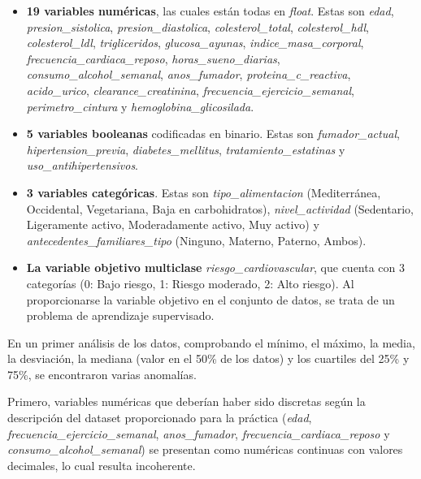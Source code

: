 \documentclass[journal,onecolumn]{IEEEtran}
\begin{document}
\begin{itemize}
    \item \textbf{19 variables numéricas}, las cuales están todas en \textit{float}. Estas son \textit{edad}, \textit{presion\_sistolica}, \textit{presion\_diastolica}, \textit{colesterol\_total}, \textit{colesterol\_hdl}, \textit{colesterol\_ldl}, \textit{trigliceridos}, \textit{glucosa\_ayunas}, \textit{indice\_masa\_corporal}, \textit{frecuencia\_cardiaca\_reposo}, \textit{horas\_sueno\_diarias}, \textit{consumo\_alcohol\_semanal}, \textit{anos\_fumador}, \textit{proteina\_c\_reactiva}, \textit{acido\_urico}, \textit{clearance\_creatinina}, \textit{frecuencia\_ejercicio\_semanal}, \textit{perimetro\_cintura} y \textit{hemoglobina\_glicosilada}.
    
    \item \textbf{5 variables booleanas} codificadas en binario. Estas son \textit{fumador\_actual}, \textit{hipertension\_previa}, \textit{diabetes\_mellitus}, \textit{tratamiento\_estatinas} y \textit{uso\_antihipertensivos}.

    \item \textbf{3 variables categóricas}. Estas son \textit{tipo\_alimentacion} (Mediterránea, Occidental, Vegetariana, Baja en carbohidratos), \textit{nivel\_actividad} (Sedentario, Ligeramente activo, Moderadamente activo, Muy activo) y \textit{antecedentes\_familiares\_tipo} (Ninguno, Materno, Paterno, Ambos).

    \item \textbf{La variable objetivo multiclase} \textit{riesgo\_cardiovascular}, que cuenta con 3 categorías (0: Bajo riesgo, 1: Riesgo moderado, 2: Alto riesgo). Al proporcionarse la variable objetivo en el conjunto de datos, se trata de un problema de aprendizaje supervisado.
\end{itemize}

En un primer análisis de los datos, comprobando el mínimo, el máximo, la media, la desviación, la mediana (valor en el 50\% de los datos) y los cuartiles del 25\% y 75\%, se encontraron varias anomalías.


Primero, variables numéricas que deberían haber sido discretas según la descripción del dataset proporcionado para la práctica (\textit{edad}, \textit{frecuencia\_ejercicio\_semanal}, \textit{anos\_fumador}, \textit{frecuencia\_cardiaca\_reposo} y \textit{consumo\_alcohol\_semanal}) se presentan como numéricas continuas con valores decimales, lo cual resulta incoherente.
\end{document}
